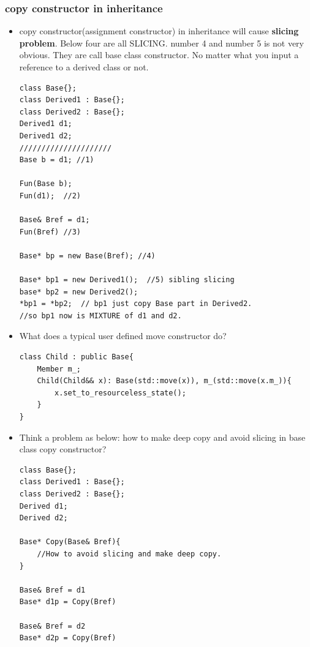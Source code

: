 \documentclass[a4paper,11pt,twoside]{book}
\begin{document}
\subsubsection{copy constructor in inheritance}

\begin{itemize}
	\item copy constructor(assignment constructor) in inheritance will cause \textbf{slicing problem}.   Below four are all SLICING.  number 4 and number 5 is not very obvious. They are call base class constructor.  No matter what you input a reference to a derived class or not.
\begin{lstlisting}[numbers=none]
class Base{};
class Derived1 : Base{};
class Derived2 : Base{};
Derived1 d1;
Derived1 d2;
/////////////////////
Base b = d1; //1)
	
Fun(Base b);
Fun(d1);  //2)
	
Base& Bref = d1;
Fun(Bref) //3)
	
Base* bp = new Base(Bref); //4)
	
Base* bp1 = new Derived1();  //5) sibling slicing
base* bp2 = new Derived2();
*bp1 = *bp2;  // bp1 just copy Base part in Derived2.
//so bp1 now is MIXTURE of d1 and d2.
\end{lstlisting}

	\item What does a typical user defined move constructor do?
\begin{lstlisting}[numbers=none]
class Child : public Base{
	Member m_;
	Child(Child&& x): Base(std::move(x)), m_(std::move(x.m_)){
		x.set_to_resourceless_state();
	}
}
	\end{lstlisting}
	
	
\item Think a problem as below: how to make deep copy and avoid slicing in base class copy constructor?
\begin{lstlisting}[numbers=none]
class Base{};
class Derived1 : Base{};
class Derived2 : Base{};
Derived d1;
Derived d2;
	
Base* Copy(Base& Bref){
	//How to avoid slicing and make deep copy.
}
	
Base& Bref = d1
Base* d1p = Copy(Bref)

Base& Bref = d2
Base* d2p = Copy(Bref)
	\end{lstlisting}
	

\end{itemize}
\end{document}
